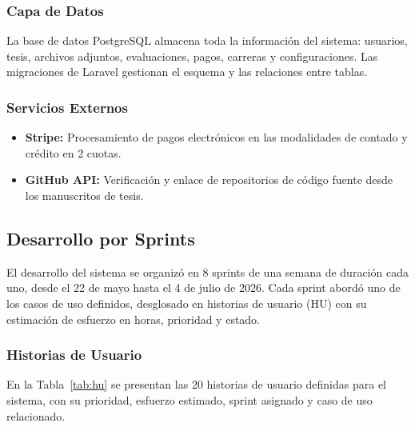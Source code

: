 \subsubsection*{Capa de Datos}

La base de datos PostgreSQL almacena toda la información del sistema: usuarios, tesis, archivos adjuntos, evaluaciones, pagos, carreras y configuraciones. Las migraciones de Laravel gestionan el esquema y las relaciones entre tablas.

\subsubsection*{Servicios Externos}

\begin{itemize}
    \item \textbf{Stripe:} Procesamiento de pagos electrónicos en las modalidades de contado y crédito en 2 cuotas.
    \item \textbf{GitHub API:} Verificación y enlace de repositorios de código fuente desde los manuscritos de tesis.
\end{itemize}

\subsection{Desarrollo por Sprints}

El desarrollo del sistema se organizó en 8 sprints de una semana de duración cada uno, desde el 22 de mayo hasta el 4 de julio de 2026. Cada sprint abordó uno de los casos de uso definidos, desglosado en historias de usuario (HU) con su estimación de esfuerzo en horas, prioridad y estado.

\subsubsection{Historias de Usuario}

En la Tabla~\ref{tab:hu} se presentan las 20 historias de usuario definidas para el sistema, con su prioridad, esfuerzo estimado, sprint asignado y caso de uso relacionado.

